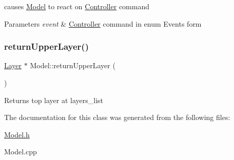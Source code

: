 causes \hyperlink{class_model}{Model} to react on \hyperlink{class_controller}{Controller} command 


\begin{DoxyParams}{Parameters}
{\em event} & \hyperlink{class_controller}{Controller} command in enum Events form \\
\hline
\end{DoxyParams}
\mbox{\label{class_model_acdaa9cd882c6f43d0ea60bc7010acfa2}} 
\subsubsection{\texorpdfstring{return\+Upper\+Layer()}{returnUpperLayer()}}
{\footnotesize\ttfamily \hyperlink{class_layer}{Layer} $\ast$ Model\+::return\+Upper\+Layer (\begin{DoxyParamCaption}{ }\end{DoxyParamCaption})}

\begin{DoxyReturn}{Returns}
top layer at \textquotesingle{}layers\+\_\+list\textquotesingle{} 
\end{DoxyReturn}


The documentation for this class was generated from the following files\+:\begin{DoxyCompactItemize}
\item 
\hyperlink{_model_8h}{Model.\+h}\item 
Model.\+cpp\end{DoxyCompactItemize}
